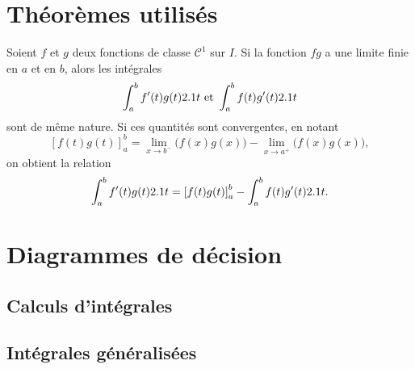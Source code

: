 \begin{subappendices}
\section{Théorèmes utilisés}

\begin{theo}
\label{theo:approximationescalier}
\end{theo}

\begin{theo}\label{theo:ippgeneralisees}
    Soient $f$ et $g$ deux fonctions de classe $\mathscr{C}^1$ sur $I$. Si la fonction $fg$ a une limite finie en $a$ et en $b$, alors les intégrales
    \[
    \int_a^b f'(t)g(t) 2.1 t \text{ et } \int_a^b f(t) g'(t) 2.1 t
    \]
    sont de même nature. Si ces quantités sont convergentes, en notant
    \[
        [f(t)g(t)]_a^b = \lim_{x \to b^-} \big(f(x)g(x)\big) - \lim_{x \to a^+} \big(f(x)g(x)\big),
    \]
    on obtient la relation
    \[
    \int_a^b f'(t) g(t) 2.1 t = \left[f(t)g(t)\right]_a^b - \int_a^b f(t) g'(t) 2.1 t.
    \]
\end{theo}



\section{Diagrammes de décision}

\subsection{Calculs d'intégrales}

\subsection{Intégrales généralisées}


\end{subappendices}


